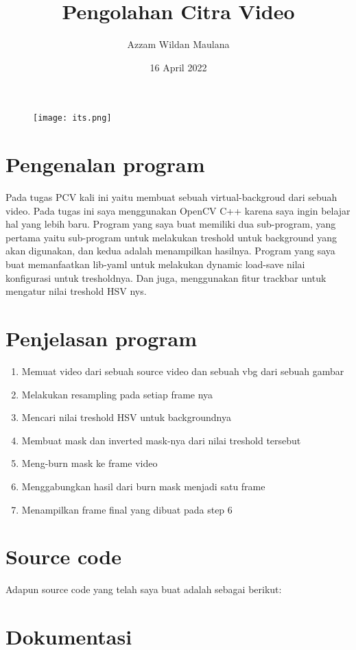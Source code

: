 \documentclass[11pt,a4paper,english]{article}
\title{Pengolahan Citra Video}
\author{Azzam Wildan Maulana}
\date{16 April 2022}
\begin{document}
\maketitle
\begin{figure}[h]
\centering
\texttt{[image: its.png]}
\end{figure}	

\pagebreak

\section{Pengenalan program}
Pada tugas PCV kali ini yaitu membuat sebuah virtual-backgroud dari sebuah video. Pada tugas ini saya menggunakan OpenCV C++ karena saya ingin belajar hal yang lebih baru. Program yang saya buat memiliki dua sub-program, yang pertama yaitu sub-program untuk melakukan treshold untuk background yang akan digunakan, dan kedua adalah menampilkan hasilnya.   
Program yang saya buat memanfaatkan lib-yaml untuk melakukan dynamic load-save nilai konfigurasi untuk tresholdnya. Dan juga, menggunakan fitur trackbar untuk mengatur nilai treshold HSV nys.     

\section{Penjelasan program}
\begin{enumerate}
  \item Memuat video dari sebuah source video dan sebuah vbg dari sebuah gambar
  \item Melakukan resampling pada setiap frame nya
  \item Mencari nilai treshold HSV untuk backgroundnya
  \item Membuat mask dan inverted mask-nya dari nilai treshold tersebut 
  \item Meng-burn mask ke frame video
  \item Menggabungkan hasil dari burn mask menjadi satu frame
  \item Menampilkan frame final yang dibuat pada step 6
\end{enumerate}

\section{Source code}
Adapun source code yang telah saya buat adalah sebagai berikut: 


\section{Dokumentasi}
\end{document}
